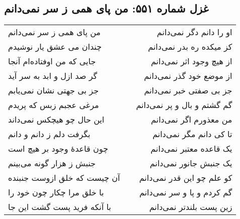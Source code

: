 \begin{center}
\section*{غزل شماره ۵۵۱: من پای همی ز سر نمی‌دانم}
\label{sec:551}
\begin{longtable}{l p{0.5cm} r}
من پای همی ز سر نمی‌دانم
&&
او را دانم دگر نمی‌دانم
\\
چندان می عشق یار نوشیدم
&&
کز میکده ره بدر نمی‌دانم
\\
جایی که من اوفتاده‌ام آنجا
&&
از هیچ وجود اثر نمی‌دانم
\\
گر صد ازل و ابد به سر آید
&&
از موضع خود گذر نمی‌دانم
\\
جز بی جهتی نشان نمی‌یابم
&&
جز بی صفتی خبر نمی‌دانم
\\
مرغی عجبم زبس که پریدم
&&
گم گشتم و بال و پر نمی‌دانم
\\
این حال چو هیچکس نمی‌داند
&&
من معذورم اگر نمی‌دانم
\\
بگرفت دلم ز دانم و دانم
&&
تا کی دانم مگر نمی‌دانم
\\
چون قاعدهٔ وجود بر هیچ است
&&
یک قاعده معتبر نمی‌دانم
\\
جنبش ز هزار گونه می‌بینم
&&
یک جنبش جانور نمی‌دانم
\\
آن چیست که خلق ازوست جنبنده
&&
کو علم چو این قدر نمی‌دانم
\\
با خلق مرا چکار چون خود را
&&
گم کردم و پا و سر نمی‌دانم
\\
با آنکه فرید پست گشت این جا
&&
زین پست بلندتر نمی‌دانم
\\
\end{longtable}
\end{center}
